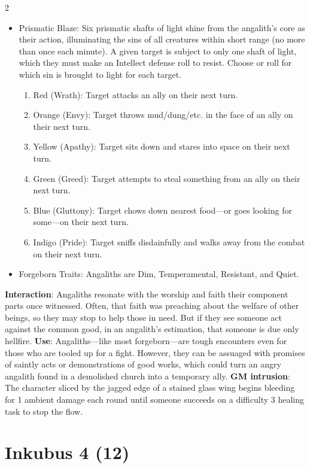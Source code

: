 \begin{multicols}{2}
\begin{itemize}
\item	Prismatic Blaze: Six prismatic shafts of light shine from the angalith’s core as their action, illuminating the sins of all creatures within short range (no more than once each minute). A given target is subject to only one shaft of light, which they must make an Intellect defense roll to resist. Choose or roll for which sin is brought to light for each target. 
\begin{enumerate}
\item	Red (Wrath): Target attacks an ally on their next turn. 
\item	Orange (Envy): Target throws mud/dung/etc. in the face of an ally on their next turn. 
\item	Yellow (Apathy): Target sits down and stares into space on their next turn. 
\item	Green (Greed): Target attempts to steal something from an ally on their next turn. 
\item	Blue (Gluttony): Target chows down nearest food—or goes looking for some—on their next turn. 
\item	Indigo (Pride): Target sniffs disdainfully and walks away from the combat on their next turn. 
\end{enumerate}
\item Forgeborn Traits: Angaliths are Dim, Temperamental, Resistant, and Quiet. 
\end{itemize}

\textbf{Interaction}: Angaliths resonate with the worship and faith their component parts once witnessed. Often, that faith was preaching about the welfare of other beings, so they may stop to help those in need. But if they see someone act against the common good, in an angalith’s estimation, that someone is due only hellfire.
\textbf{Use}: Angaliths—like most forgeborn—are tough encounters even for those who are tooled up for a fight. However, they can be assuaged with promises of saintly acts or demonstrations of good works, which could turn an angry angalith found in a demolished church into a temporary ally.
\textbf{GM intrusion}: The character sliced by the jagged edge of a stained glass wing begins bleeding for 1 ambient damage each round until someone succeeds on a difficulty 3 healing task to stop the flow.

\section{Inkubus 4 (12)}


\end{multicols}
